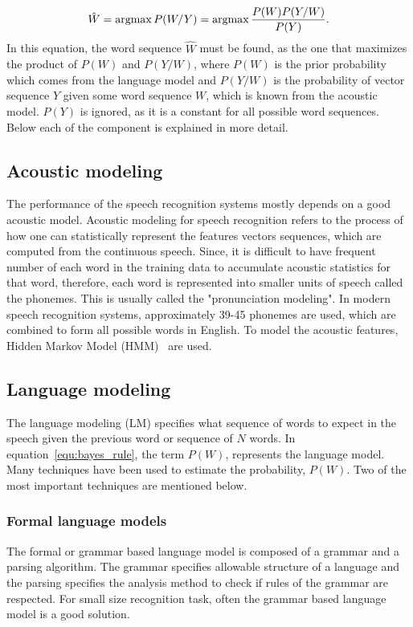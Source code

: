 \documentclass[a4paper, 12pt]{article}
\newcommand{\argmax}{\operatornamewithlimits{argmax}}
\begin{document}
\begin{equation}
\label{equ:bayes_rule}
\hat{W} = \argmax P(W/Y) = \argmax\frac{P(W)P(Y/W)}{P(Y)}.
\end{equation}
In this equation, the word sequence $\hat{W}$ must be found, as the one that maximizes the product of $P(W)$ and $P(Y/W)$, where $P(W)$ is the prior probability which comes from the language model and $P(Y/W)$ is the probability of vector sequence $Y$ given some word sequence $W$, which is known from the acoustic model. $P(Y)$ is ignored, as it is a constant for all possible word sequences. Below each of the component is explained in more detail.
\subsection{Acoustic modeling}
The performance of the speech recognition systems mostly depends on a good acoustic model. Acoustic modeling for speech recognition refers to the process of how one can statistically represent the features vectors sequences, which are computed from the continuous speech. Since, it is difficult to have frequent number of each word in the training data to accumulate acoustic statistics for that word, therefore, each word is represented into smaller units of speech called the phonemes. This is usually called the  "pronunciation modeling". In modern speech recognition systems, approximately 39-45 phonemes are used, which are combined to form all possible words in English. To model the acoustic features, Hidden Markov Model (HMM)~\cite{hmm_for_SR} are used.

\subsection{Language modeling}
The language modeling (LM) specifies what sequence of words to expect in the speech given the previous word or sequence of $N$ words. In equation~\ref{equ:bayes_rule}, the term $P(W)$, represents the language model. Many techniques have been used to estimate the probability, $P(W)$. Two of the most important techniques are mentioned below.
\subsubsection{Formal language models} 
\label{sec:gramar_based_lm}
The formal or grammar based language model is composed of a grammar and a parsing algorithm. The grammar specifies allowable structure of a language and the parsing specifies the analysis method to check if rules of the grammar are respected. For small size recognition task, often the grammar based language model is a good solution. 
\end{document}
